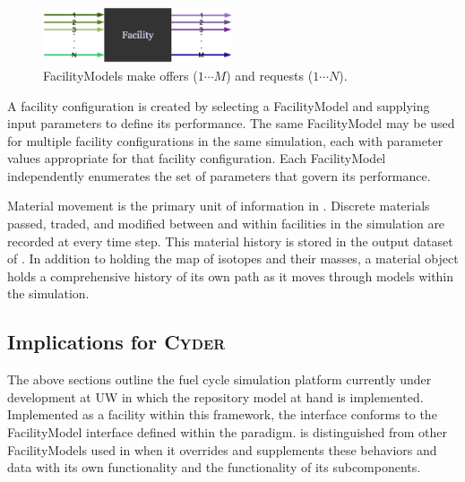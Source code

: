 \begin{figure}[htb!]
  \begin{center}
    \includegraphics[width=0.5\textwidth]{./chapters/paradigm/facility.eps}
  \end{center}
  \caption[\Cyclus FacilityModel offer and request interface.]{\Cyclus FacilityModels make offers ($1\cdots M$) and requests ($1\cdots N$).}
  \label{fig:facility}
\end{figure}


A facility configuration is created by selecting a FacilityModel and supplying 
input parameters to define its performance.  The same FacilityModel may be used 
for multiple facility configurations in the same simulation, each with parameter 
values appropriate for that facility configuration.  Each FacilityModel 
independently enumerates the set of parameters that govern its performance.  


Material movement is the primary unit of information in \Cyclus.  
Discrete materials passed, traded, and modified between and within facilities 
in the simulation are recorded at every time step.  This material 
history is stored in the output dataset of \Cyclus. In addition to 
holding the map of isotopes and their masses, a material object holds 
a comprehensive history of its own path as it moves through models 
within the simulation. 

\subsection{Implications for \textsc{Cyder}}

The above sections outline the \Cyclus fuel cycle simulation platform currently 
under development at \gls{UW} in which the \Cyder repository model at hand is 
implemented.  Implemented as a facility within this framework, the \Cyder 
interface conforms to the FacilityModel interface defined within the \Cyclus 
paradigm.  \Cyder is distinguished from other FacilityModels used in \Cyclus 
when it overrides and supplements these behaviors and data with its own 
functionality and the functionality of its subcomponents.

